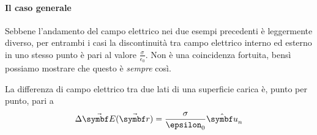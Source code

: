 \paragraph{Il caso generale}
Sebbene l'andamento del campo elettrico nei due esempi precedenti è leggermente diverso, per entrambi i casi la discontinuità tra campo elettrico interno ed esterno in uno stesso punto è pari al valore $\frac{\sigma}{\epsilon_0}$. Non è una coincidenza fortuita, bensì possiamo mostrare che questo è \textit{sempre} così.
\begin{proposition}
	La differenza di campo elettrico tra due lati di una superficie carica è, punto per punto, pari a 
	\begin{equation*}
		\Delta \vba{E}(\vba{r})=\frac{\sigma}{\epsilon_0}\vbh{u}_n
	\end{equation*}
\end{proposition}

